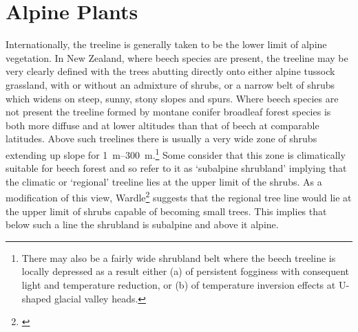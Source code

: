\chapter{Alpine Plants}

Internationally, the treeline is generally taken to be the lower limit of alpine vegetation.
In New Zealand, where beech species are present, the treeline may be very clearly defined with the trees abutting directly onto either alpine tussock grassland, with or without an admixture of shrubs, or a narrow belt of shrubs which widens on steep, sunny, stony slopes and spurs.
Where beech species are not present the treeline formed by montane conifer broadleaf forest species is both more diffuse and at lower altitudes than that of beech at comparable latitudes.
Above such treelines there is usually a very wide zone of shrubs extending up slope for \SIrange{1}{300}{\metre}.\footnote{There may also be a fairly wide shrubland belt where the beech treeline is locally depressed as a result either (a) of persistent fogginess with consequent light and temperature reduction, or (b) of temperature inversion effects at U-shaped glacial valley heads.}
Some consider that this zone is climatically suitable for beech forest and so refer to it as `subalpine shrubland' implying that the climatic or `regional' treeline lies at the upper limit of the shrubs.
As a modification of this view, Wardle\footnote{\cite{wardle1965comparison}} suggests that the regional tree line would lie at the upper limit of shrubs capable of becoming small trees.
This implies that below such a line the shrubland is subalpine and above it alpine.

